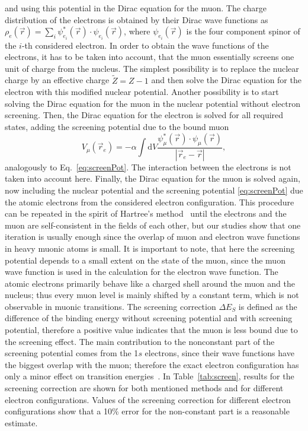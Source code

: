 and using this potential in the Dirac equation for the muon. The charge distribution of the electrons is obtained by their Dirac wave functions as $\rho_e (\vec{r})=\sum_i \psi_{e_i}^*(\vec{r})\cdot \psi_{e_i}(\vec{r})$, where $\psi_{e_i}(\vec{r})$  is the four component spinor of the $i$-th considered electron. In order to obtain the wave functions of the electrons, it has to be taken into account, that the muon essentially screens one unit of charge from the nucleus. The simplest possibility is to replace the nuclear charge by an effective charge $\tilde{Z}=Z-1$ and then solve the Dirac equation for the electron with this modified nuclear potential. Another possibility is to start solving the Dirac equation for the muon in the nuclear potential without electron screening. Then, the Dirac equation for the electron is solved for all required states, adding the screening potential due to the bound muon
\begin{equation}
V_{\mu}(\vec{r}_e)=-\alpha \int \mathrm{d}V\frac{\psi_\mu^*(\vec{r})\cdot \psi_\mu(\vec{r})}{|\vec{r}_e-\vec{r}|},
\end{equation}
analogously to Eq.~\eqref{eq:screenPot}.
The interaction between the electrons is not taken into account here. Finally, the Dirac equation for the muon is solved again, now including the nuclear potential and the screening potential \eqref{eq:screenPot} due the atomic electrons from the considered electron configuration. This procedure can be repeated in the spirit of Hartree's method~\cite{bethe_salpeter} until the electrons and the muon are self-consistent in the fields of each other, but our studies show that one iteration is usually enough since the overlap of muon and electron wave functions in heavy muonic atoms is small. It is important to note, that here the screening potential depends to a small extent on the state of the muon, since the muon wave function is used in the calculation for the electron wave function. The atomic electrons primarily behave like a charged shell around the muon and the nucleus; thus every muon level is mainly shifted by a constant term, which is not observable in muonic transitions. The screening correction $\Delta E_S$ is defined as the difference of the binding energy without screening potential and with screening potential, therefore a positive value indicates that the muon is less bound due to the screening effect. The main contribution to the nonconstant part of the screening potential comes from the 1$s$ electrons, since their wave functions have the biggest overlap with the muon; therefore the exact electron configuration has only a minor effect on transition energies~\cite{vogel1973}. In Table~\ref{tab:screen}, results for the screening correction are shown for both mentioned methods and for different electron configurations. Values of the screening correction for different electron configurations show that a 10\% error for the non-constant part is a reasonable estimate.
%
%
